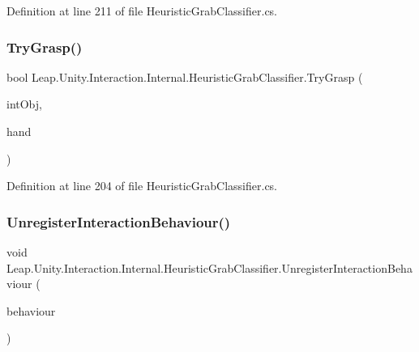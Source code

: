 Definition at line 211 of file Heuristic\+Grab\+Classifier.\+cs.

\mbox{\label{class_leap_1_1_unity_1_1_interaction_1_1_internal_1_1_heuristic_grab_classifier_a162bb92ee41f1376f650d3dd351aa2f0}} 
\subsubsection{\texorpdfstring{TryGrasp()}{TryGrasp()}}
{\footnotesize\ttfamily bool Leap.\+Unity.\+Interaction.\+Internal.\+Heuristic\+Grab\+Classifier.\+Try\+Grasp (\begin{DoxyParamCaption}\item[{\mbox{\hyperlink{interface_leap_1_1_unity_1_1_interaction_1_1_i_interaction_behaviour}{I\+Interaction\+Behaviour}}}]{int\+Obj,  }\item[{\mbox{\hyperlink{class_leap_1_1_hand}{Hand}}}]{hand }\end{DoxyParamCaption})}



Definition at line 204 of file Heuristic\+Grab\+Classifier.\+cs.

\mbox{\label{class_leap_1_1_unity_1_1_interaction_1_1_internal_1_1_heuristic_grab_classifier_a40a2327dbe8e9ec05bf97fbb32ed9324}} 
\subsubsection{\texorpdfstring{UnregisterInteractionBehaviour()}{UnregisterInteractionBehaviour()}}
{\footnotesize\ttfamily void Leap.\+Unity.\+Interaction.\+Internal.\+Heuristic\+Grab\+Classifier.\+Unregister\+Interaction\+Behaviour (\begin{DoxyParamCaption}\item[{\mbox{\hyperlink{interface_leap_1_1_unity_1_1_interaction_1_1_i_interaction_behaviour}{I\+Interaction\+Behaviour}}}]{behaviour }\end{DoxyParamCaption})}



